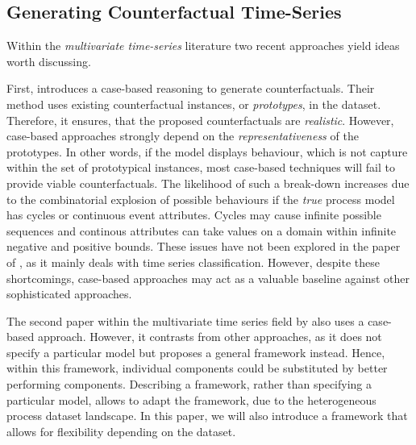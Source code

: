 \documentclass[./../../paper.tex]{subfiles}
\begin{document}
\subsection{Generating Counterfactual Time-Series}
Within the \emph{multivariate time-series} literature two recent approaches yield ideas worth discussing.

First, \citeauthor{delaney_InstanceBasedCounterfactualExplanations_2021} introduces a case-based reasoning to generate counterfactuals\autocite{delaney_InstanceBasedCounterfactualExplanations_2021}. Their method uses existing counterfactual instances, or \emph{prototypes}, in the dataset. Therefore, it ensures, that the proposed counterfactuals are \emph{realistic}. However, case-based approaches strongly depend on the \emph{representativeness} of the prototypes\autocite[p. 192]{molnar2019}. In other words, if the model displays behaviour, which is not capture within the set of prototypical instances, most case-based techniques will fail to provide viable counterfactuals. The likelihood of such a break-down increases due to the combinatorial explosion of possible behaviours if the \emph{true} process model has cycles or continuous event attributes. Cycles may cause infinite possible sequences and continous attributes can take values on a domain within infinite negative and positive bounds. These issues have not been explored in the paper of \citeauthor{delaney_InstanceBasedCounterfactualExplanations_2021}, as it mainly deals with time series classification\autocite{delaney_InstanceBasedCounterfactualExplanations_2021}. However, despite these shortcomings, case-based approaches may act as a valuable baseline against other sophisticated approaches.

The second paper within the multivariate time series field by \citeauthor{ates_CounterfactualExplanationsMultivariate_2021} also uses a case-based approach\autocite{ates_CounterfactualExplanationsMultivariate_2021}. However, it contrasts from other approaches, as it does not specify a particular model but proposes a general framework instead. Hence, within this framework, individual components could be substituted by better performing components. Describing a framework, rather than specifying a particular model, allows to adapt the framework, due to the heterogeneous process dataset landscape. In this paper, we will also introduce a framework that allows for flexibility depending on the dataset. 
\end{document}
